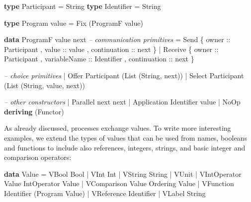 \documentclass[runningheads,plain]{llncs}
\newenvironment{Shaded}{}{}
\newcommand{\KeywordTok}[1]{\textcolor[rgb]{0.00,0.44,0.13}{\textbf{#1}}}
\newcommand{\DataTypeTok}[1]{\textcolor[rgb]{0.56,0.13,0.00}{#1}}
\newcommand{\CommentTok}[1]{\textcolor[rgb]{0.38,0.63,0.69}{\textit{#1}}}
\newcommand{\OtherTok}[1]{\textcolor[rgb]{0.00,0.44,0.13}{#1}}
\newcommand{\FunctionTok}[1]{\textcolor[rgb]{0.02,0.16,0.49}{#1}}
\newcommand{\NormalTok}[1]{#1}
\begin{document}
\begin{Shaded}
\begin{Highlighting}[]
\KeywordTok{type} \DataTypeTok{Participant} \FunctionTok{=} \DataTypeTok{String}
\KeywordTok{type} \DataTypeTok{Identifier} \FunctionTok{=} \DataTypeTok{String}

\KeywordTok{type} \DataTypeTok{Program}\NormalTok{ value }\FunctionTok{=} \DataTypeTok{Fix}\NormalTok{ (}\DataTypeTok{ProgramF}\NormalTok{ value) }

\KeywordTok{data} \DataTypeTok{ProgramF}\NormalTok{ value next }
    \CommentTok{-- communication primitives}
    \FunctionTok{=} \DataTypeTok{Send} 
\NormalTok{        \{}\OtherTok{ owner ::} \DataTypeTok{Participant}
\NormalTok{        ,}\OtherTok{ value ::}\NormalTok{ value}
\NormalTok{        ,}\OtherTok{ continuation ::}\NormalTok{ next }
\NormalTok{        \}}
    \FunctionTok{|} \DataTypeTok{Receive} 
\NormalTok{        \{}\OtherTok{ owner ::} \DataTypeTok{Participant}
\NormalTok{        ,}\OtherTok{ variableName ::} \DataTypeTok{Identifier}
\NormalTok{        ,}\OtherTok{ continuation ::}\NormalTok{ next  }
\NormalTok{        \}}

    \CommentTok{-- choice primitives}
    \FunctionTok{|} \DataTypeTok{Offer} \DataTypeTok{Participant}\NormalTok{ (}\DataTypeTok{List}\NormalTok{ (}\DataTypeTok{String}\NormalTok{, next))}
    \FunctionTok{|} \DataTypeTok{Select} \DataTypeTok{Participant}\NormalTok{ (}\DataTypeTok{List}\NormalTok{ (}\DataTypeTok{String}\NormalTok{, value, next))}

    \CommentTok{-- other constructors }
    \FunctionTok{|} \DataTypeTok{Parallel}\NormalTok{ next next }
    \FunctionTok{|} \DataTypeTok{Application} \DataTypeTok{Identifier}\NormalTok{ value}
    \FunctionTok{|} \DataTypeTok{NoOp}
    \KeywordTok{deriving}\NormalTok{ (}\DataTypeTok{Functor}\NormalTok{) }
\end{Highlighting}
\end{Shaded}

As already discussed, processes exchange values. 
To write more interesting examples,
we extend the types of values that can be used from names, booleans and
functions to   include also references, integers, strings, and basic
integer and comparison operators:

\begin{Shaded}
\begin{Highlighting}[]
\KeywordTok{data} \DataTypeTok{Value} 
    \FunctionTok{=} \DataTypeTok{VBool} \DataTypeTok{Bool}
    \FunctionTok{|} \DataTypeTok{VInt} \DataTypeTok{Int}
    \FunctionTok{|} \DataTypeTok{VString} \DataTypeTok{String}
    \FunctionTok{|} \DataTypeTok{VUnit}
    \FunctionTok{|} \DataTypeTok{VIntOperator} \DataTypeTok{Value} \DataTypeTok{IntOperator} \DataTypeTok{Value} 
    \FunctionTok{|} \DataTypeTok{VComparison} \DataTypeTok{Value} \DataTypeTok{Ordering} \DataTypeTok{Value}
    \FunctionTok{|} \DataTypeTok{VFunction} \DataTypeTok{Identifier}\NormalTok{ (}\DataTypeTok{Program} \DataTypeTok{Value}\NormalTok{)}
    \FunctionTok{|} \DataTypeTok{VReference} \DataTypeTok{Identifier} 
    \FunctionTok{|} \DataTypeTok{VLabel} \DataTypeTok{String}
\end{Highlighting}
\end{Shaded}
\end{document}

